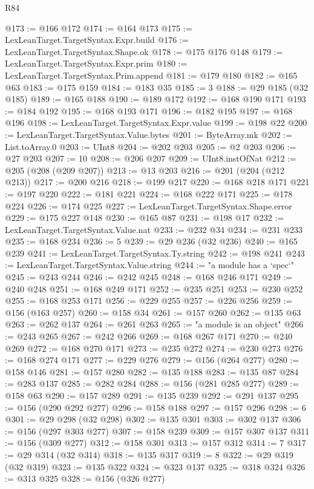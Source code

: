 \begin{lexlean}{R84}
\begin{coremodule}
@173 := @166 @172
@174 := @164 @173
@175 := LexLeanTarget.TargetSyntax.Expr.build
@176 := LexLeanTarget.TargetSyntax.Shape.ok
@178 := @175 @176 @148
@179 := LexLeanTarget.TargetSyntax.Expr.prim
@180 := LexLeanTarget.TargetSyntax.Prim.append
@181 := @179 @180
@182 := @165 @63
@183 := @175 @159
@184 := @183 @35
@185 := 3
@188 := @29 @185 (@32 @185)
@189 := @165 @188
@190 := @189 @172
@192 := @168 @190 @171
@193 := @184 @192
@195 := @168 @193 @171
@196 := @182 @195
@197 := @168 @196
@198 := LexLeanTarget.TargetSyntax.Expr.value
@199 := @198 @22
@200 := LexLeanTarget.TargetSyntax.Value.bytes
@201 := ByteArray.mk
@202 := List.toArray.{0}
@203 := UInt8
@204 := @202 @203
@205 := @2 @203
@206 := @27 @203
@207 := 10
@208 := @206 @207
@209 := UInt8.instOfNat
@212 := @205 (@208 (@209 @207))
@213 := @13 @203
@216 := @201 (@204 (@212 @213))
@217 := @200 @216
@218 := @199 @217
@220 := @168 @218 @171
@221 := @197 @220
@222 := @181 @221
@224 := @168 @222 @171
@225 := @178 @224
@226 := @174 @225
@227 := LexLeanTarget.TargetSyntax.Shape.error
@229 := @175 @227 @148
@230 := @165 @87
@231 := @198 @17
@232 := LexLeanTarget.TargetSyntax.Value.nat
@233 := @232 @34
@234 := @231 @233
@235 := @168 @234
@236 := 5
@239 := @29 @236 (@32 @236)
@240 := @165 @239
@241 := LexLeanTarget.TargetSyntax.Ty.string
@242 := @198 @241
@243 := LexLeanTarget.TargetSyntax.Value.string
@244 := "a module has a `spec`"
@245 := @243 @244
@246 := @242 @245
@248 := @168 @246 @171
@249 := @240 @248
@251 := @168 @249 @171
@252 := @235 @251
@253 := @230 @252
@255 := @168 @253 @171
@256 := @229 @255
@257 := @226 @256
@259 := @156 (@163 @257)
@260 := @158 @34
@261 := @157 @260
@262 := @135 @63
@263 := @262 @137
@264 := @261 @263
@265 := "a module is an object"
@266 := @243 @265
@267 := @242 @266
@269 := @168 @267 @171
@270 := @240 @269
@272 := @168 @270 @171
@273 := @235 @272
@274 := @230 @273
@276 := @168 @274 @171
@277 := @229 @276
@279 := @156 (@264 @277)
@280 := @158 @146
@281 := @157 @280
@282 := @135 @188
@283 := @135 @87
@284 := @283 @137
@285 := @282 @284
@288 := @156 (@281 @285 @277)
@289 := @158 @63
@290 := @157 @289
@291 := @135 @239
@292 := @291 @137
@295 := @156 (@290 @292 @277)
@296 := @158 @188
@297 := @157 @296
@298 := 6
@301 := @29 @298 (@32 @298)
@302 := @135 @301
@303 := @302 @137
@306 := @156 (@297 @303 @277)
@307 := @158 @239
@309 := @157 @307 @137
@311 := @156 (@309 @277)
@312 := @158 @301
@313 := @157 @312
@314 := 7
@317 := @29 @314 (@32 @314)
@318 := @135 @317
@319 := 8
@322 := @29 @319 (@32 @319)
@323 := @135 @322
@324 := @323 @137
@325 := @318 @324
@326 := @313 @325
@328 := @156 (@326 @277)

\end{coremodule}
\end{lexlean}
